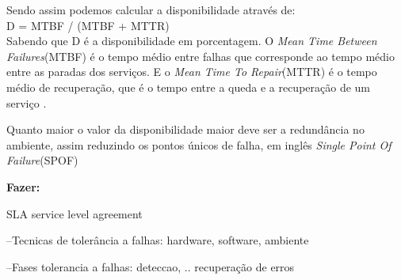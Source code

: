 Sendo assim podemos calcular a disponibilidade através de:\\
D = MTBF / (MTBF + MTTR)\\
Sabendo que D é a disponibilidade em porcentagem. O \textit{Mean Time Between Failures}(MTBF) é o tempo médio entre falhas que corresponde
ao tempo médio entre as paradas dos serviços. E o \textit{Mean Time To Repair}(MTTR) é o tempo médio de recuperação, que é o tempo 
entre a queda e a recuperação de um serviço \cite{goncalves2009}.

Quanto maior o valor da disponibilidade maior deve ser a redundância no ambiente, assim reduzindo os pontos únicos de falha,
em inglês \textit{Single Point Of Failure}(SPOF)



\textbf{Fazer:} 

SLA service level agreement

--Tecnicas de tolerância a falhas: hardware, software, ambiente

--Fases tolerancia a falhas: deteccao, .. recuperação de erros

